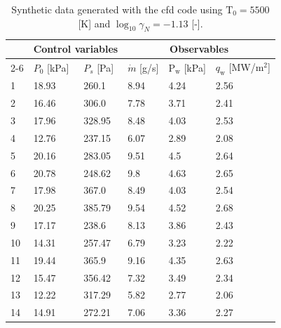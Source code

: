 \begin{table}[htbp] 
  \small
  \centering
  \begin{tabular}{|p{0.5cm}|p{1.5cm}|p{1.5cm}|p{1.5cm}|p{1.5cm}|p{2.2cm}|} 
    \hline
    & \multicolumn{2}{|c|}{\textbf{Control variables}} &\multicolumn{3}{|c|}{\textbf{Observables}} \\ \cline{2-6} 
    & $P_0$ [kPa] & $P_s$ [Pa] & $\dot{m}$ [g/s] & $\mathrm{P}_{\mathrm{w}}$ [kPa] & $q_{\mathrm{w}}$ [MW/m$^2$] \\ \hline
      1 & 18.93 & 260.1 & 8.94 & 4.24 & 2.56  \\ 
      2 & 16.46 & 306.0 & 7.78 & 3.71 & 2.41  \\ 
      3 & 17.96 & 328.95 & 8.48 & 4.03 & 2.53  \\ 
      4 & 12.76 & 237.15 & 6.07 & 2.89 & 2.08  \\ 
      5 & 20.16 & 283.05 & 9.51 & 4.5 & 2.64  \\ 
      6 & 20.78 & 248.62 & 9.8 & 4.63 & 2.65  \\ 
      7 & 17.98 & 367.0 & 8.49 & 4.03 & 2.54  \\ 
      8 & 20.25 & 385.79 & 9.54 & 4.52 & 2.68  \\ 
      9 & 17.17 & 238.6 & 8.13 & 3.86 & 2.43  \\ 
      10 & 14.31 & 257.47 & 6.79 & 3.23 & 2.22  \\ 
      11 & 19.44 & 365.9 & 9.16 & 4.35 & 2.63  \\ 
      12 & 15.47 & 356.42 & 7.32 & 3.49 & 2.34  \\ 
      13 & 12.22 & 317.29 & 5.82 & 2.77 & 2.06  \\ 
      14 & 14.91 & 272.21 & 7.06 & 3.36 & 2.27  \\ 
    \hline
  \end{tabular}
  \caption{Synthetic data generated with the \gls{cfd} code using $\mathrm{T}_0=5500$ [K] and $\log_{10} \gamma_N = -1.13$ [-].}
  \label{tab:exp_data_2}
\end{table}

